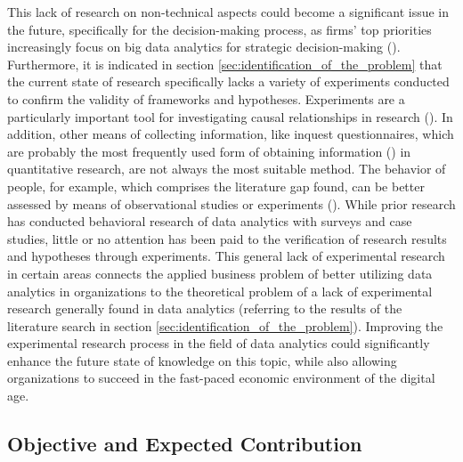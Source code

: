 This lack of research on non-technical aspects could become a significant issue in the future, specifically for the decision-making process, as firms' top priorities increasingly focus on big data analytics for strategic decision-making (\cite{Ghasemaghaei.2019}). Furthermore, it is indicated in section \ref{sec:identification_of_the_problem} that the current state of research specifically lacks a variety of experiments conducted to confirm the validity of frameworks and hypotheses. Experiments are a particularly important tool for investigating causal relationships in research (\cite{Gniewosz.2011}). In addition, other means of collecting information, like inquest questionnaires, which are probably the most frequently used form of obtaining information (\cite{Mummendey.2014}) in quantitative research, are not always the most suitable method. The behavior of people, for example, which comprises the literature gap found, can be better assessed by means of observational studies or experiments (\cite{Gniewosz.2011}). While prior research has conducted behavioral research of data analytics with surveys and case studies, little or no attention has been paid to the verification of research results and hypotheses through experiments. This general lack of experimental research in certain areas connects the applied business problem of better utilizing data analytics in organizations to the theoretical problem of a lack of experimental research generally found in data analytics (referring to the results of the literature search in section \ref{sec:identification_of_the_problem}). Improving the experimental research process in the field of data analytics could significantly enhance the future state of knowledge on this topic, while also allowing organizations to succeed in the fast-paced economic environment of the digital age.



\subsection{Objective and Expected Contribution}

